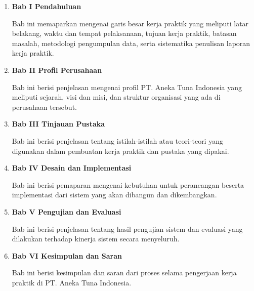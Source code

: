 \begin{enumerate}[nolistsep]

  \item \textbf{Bab I Pendahuluan}
  \vspace{0.5ex}

  Bab ini memaparkan mengenai garis besar kerja praktik yang meliputi latar belakang, waktu dan tempat pelaksanaan, tujuan kerja praktik, batasan masalah, metodologi pengumpulan data, serta sistematika penulisan laporan kerja praktik.
  \vspace{0.5ex}

  \item \textbf{Bab II Profil Perusahaan}
  \vspace{0.5ex}

  Bab ini berisi penjelasan mengenai profil PT. Aneka Tuna Indonesia yang meliputi sejarah, visi dan misi, dan struktur organisasi yang ada di perusahaan tersebut.
  \vspace{0.5ex}

  \item \textbf{Bab III Tinjauan Pustaka}
  \vspace{0.5ex}

  Bab ini berisi penjelasan tentang istilah-istilah atau teori-teori yang digunakan dalam pembuatan kerja praktik dan pustaka yang dipakai.
  \vspace{0.5ex}

  \item \textbf{Bab IV Desain dan Implementasi}
  \vspace{0.5ex}

  Bab ini berisi pemaparan mengenai kebutuhan untuk perancangan beserta implementasi dari sistem yang akan dibangun dan dikembangkan.
  \vspace{0.5ex}

  \item \textbf{Bab V Pengujian dan Evaluasi}
  \vspace{0.5ex}

  Bab ini berisi penjelasan tentang hasil pengujian sistem dan evaluasi yang dilakukan terhadap kinerja sistem secara menyeluruh.
  \vspace{0.5ex}

  \item \textbf{Bab VI Kesimpulan dan Saran}
  \vspace{0.5ex}

  Bab ini berisi kesimpulan dan saran dari proses selama pengerjaan kerja praktik di PT. Aneka Tuna Indonesia.
  \vspace{0.5ex}

\end{enumerate}
\vspace{0.5ex}
